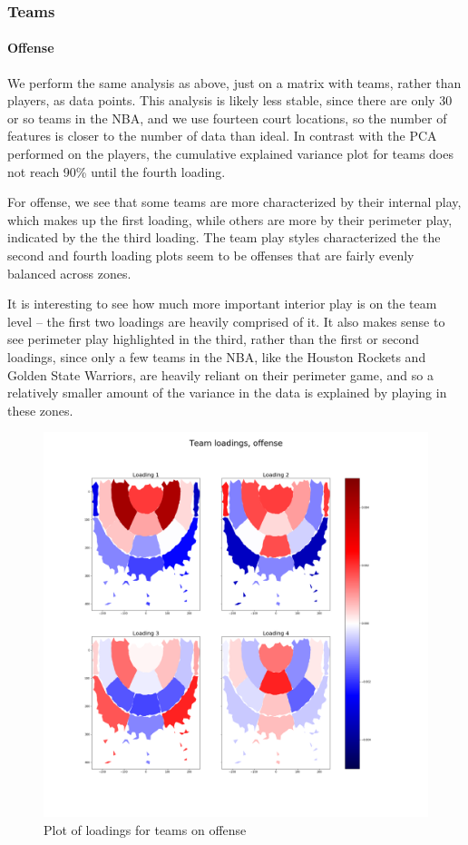 \documentclass[]{article}
\let\oldparagraph\paragraph
\renewcommand{\paragraph}[1]{\oldparagraph{#1}\mbox{}}
\begin{document}
\hypertarget{teams}{%
\subsubsection{Teams}\label{teams}}

\hypertarget{offense-1}{%
\paragraph{Offense}\label{offense-1}}

We perform the same analysis as above, just on a matrix with teams,
rather than players, as data points. This analysis is likely less
stable, since there are only 30 or so teams in the NBA, and we use
fourteen court locations, so the number of features is closer to the
number of data than ideal. In contrast with the PCA performed on the
players, the cumulative explained variance plot for teams does not reach
90\% until the fourth loading.

For offense, we see that some teams are more characterized by their
internal play, which makes up the first loading, while others are more
by their perimeter play, indicated by the the third loading. The team
play styles characterized the the second and fourth loading plots seem
to be offenses that are fairly evenly balanced across zones.

It is interesting to see how much more important interior play is on the
team level -- the first two loadings are heavily comprised of it. It
also makes sense to see perimeter play highlighted in the third, rather
than the first or second loadings, since only a few teams in the NBA,
like the Houston Rockets and Golden State Warriors, are heavily reliant
on their perimeter game, and so a relatively smaller amount of the
variance in the data is explained by playing in these zones.

\begin{figure}
\centering
\includegraphics{first_4_loadings_teams_off.png}
\caption{Plot of loadings for teams on offense}
\end{figure}
\end{document}
